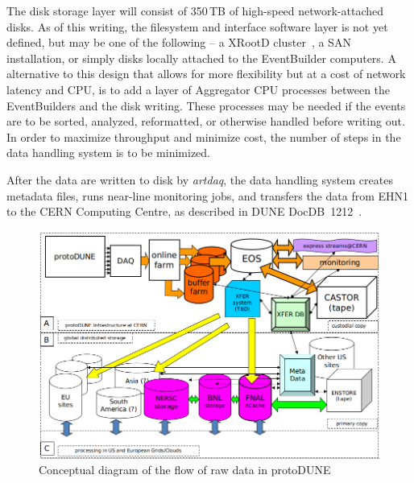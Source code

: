The disk storage layer will consist of 350\,TB of high-speed
network-attached disks.  As of this writing, the filesystem and
interface software layer is not yet defined, but may be one of the
following --
a XRootD cluster~\cite{xrootd}, a SAN installation, or
simply disks locally attached to the EventBuilder computers.  A
alternative to this design that allows for more flexibility but at a
cost of network latency and CPU, is to add a layer of Aggregator CPU
processes between the EventBuilders and the disk writing.  These
processes may be needed if the events are to be sorted, analyzed,
reformatted, or otherwise handled before writing out.  In order to
maximize throughput and minimize cost, the number of steps in the data
handling system is to be minimized.

After the data are written to disk by {\it artdaq}, the data handling
system creates metadata files, runs near-line monitoring jobs, and
transfers the data from EHN1 to the CERN Computing Centre, as
described in DUNE DocDB~1212~\cite{docdb1212}.

\begin{figure}[tbh]
\centering
\includegraphics[width=\linewidth]{figures/protoDUNE_raw_data_concept.png}
\caption{\label{fig:raw_concept}Conceptual diagram of the flow of raw data in protoDUNE}
\end{figure}

